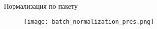 
\begin{frame}{Нормализация по пакету}
\begin{figure}
\centering
\texttt{[image: batch\_normalization\_pres.png]}
\end{figure}
\end{frame}